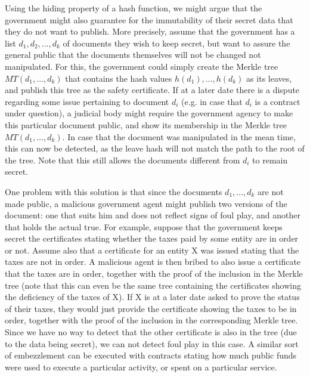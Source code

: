 Using the hiding property of a hash function, we might argue that the government might also guarantee for the immutability of their secret data that they do not want to publish. More precisely, assume that the government has a list $d_1,d_2,\ldots ,d_k$ of documents they wish to keep secret, but want to assure the general public that the documents themselves will not be changed not manipulated. For this, the government could simply create the Merkle tree $MT(d_1,\ldots ,d_k)$ that contains the hash values $h(d_1),\ldots ,h(d_k)$ as its leaves, and publish this tree as the safety certificate. If at a later date there is a dispute regarding some issue pertaining to document $d_i$ (e.g. in case that $d_i$ is a contract under question), a judicial body might require the government agency to make this particular document public, and show its membership in the Merkle tree $MT(d_1,\ldots ,d_k)$. In case that the document was manipulated in the mean time, this can now be detected, as the leave hash will not match the path to the root of the tree. Note that this still allows the documents different from $d_i$ to remain secret.

One problem with this solution is that since the documents $d_1,\ldots ,d_k$ are not made public, a malicious government agent might publish two versions of the document: one that suits him and does not reflect signs of foul play, and another that holds the actual true. For example, suppose that the government keeps secret the certificates stating whether the taxes paid by some entity are in order or not. Assume also that a certificate for an entity X was issued stating that the taxes are not in order. A malicious agent is then bribed to also issue a certificate that the taxes are in order, together with the proof of the inclusion in the Merkle tree (note that this can even be the same tree containing the certificates showing the deficiency of the taxes of X). If X is at a later date asked to prove the status of their taxes, they would just provide the certificate showing the taxes to be in order, together with the proof of the inclusion in the corresponding Merkle tree. Since we have no way to detect that the other certificate is also in the tree (due to the data being secret), we can not detect foul play in this case. A similar sort of embezzlement can be executed with contracts stating how much public funds were used to execute a particular activity, or spent on a particular service.


